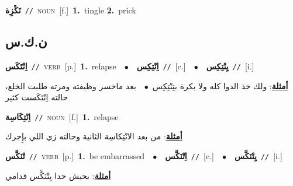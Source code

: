 \documentclass[10pt,a4paper,twoside]{article} %
\begin{document}
\begin{multicols}{2}
{\setlength\topsep{0pt}\textbf{\foreignlanguage{arabic}{نَكْزِة}}\ {\color{gray}\texttt{//}\color{black}}\ \textsc{noun}\ [f.]\ \textbf{1.}~tingle  \textbf{2.}~prick\ } \vspace{2mm}

\vspace{-3mm}
\subsection*{\color{blue}\foreignlanguage{arabic}{ن.ك.س}\color{blue}{}} 

{\setlength\topsep{0pt}\textbf{\foreignlanguage{arabic}{اِنْتَكَس}}\ {\color{gray}\texttt{//}\color{black}}\ \textsc{verb}\ [p.]\ \textbf{1.}~relapse\ \ $\bullet$\ \ \setlength\topsep{0pt}\textbf{\foreignlanguage{arabic}{اِنْتِكِس}}\ {\color{gray}\texttt{//}\color{black}}\ [c.]\ \ $\bullet$\ \ \setlength\topsep{0pt}\textbf{\foreignlanguage{arabic}{يِنْتِكِس}}\ {\color{gray}\texttt{//}\color{black}}\ [i.]\  \begin{flushright}\color{gray}\foreignlanguage{arabic}{\textbf{\underline{\foreignlanguage{arabic}{أمثلة}}}: ولك خذ الدوا كله ولا بكرة بتِنْتِكِس\ $\bullet$\ \  بعد ماخسر وظيفته ومرته طلبت الخلع، حالته اِنْتَكَست كثير}\end{flushright}\color{black}} \vspace{2mm}

{\setlength\topsep{0pt}\textbf{\foreignlanguage{arabic}{اِنْتِكَاسِة}}\ {\color{gray}\texttt{//}\color{black}}\ \textsc{noun}\ [f.]\ \textbf{1.}~relapse\  \begin{flushright}\color{gray}\foreignlanguage{arabic}{\textbf{\underline{\foreignlanguage{arabic}{أمثلة}}}: من بعد الانْتِكاسِة الثانية وحالته زي اللي بإِجرك}\end{flushright}\color{black}} \vspace{2mm}

{\setlength\topsep{0pt}\textbf{\foreignlanguage{arabic}{تْنَكَّس}}\ {\color{gray}\texttt{//}\color{black}}\ \textsc{verb}\ [p.]\ \textbf{1.}~be embarrassed\ \ $\bullet$\ \ \setlength\topsep{0pt}\textbf{\foreignlanguage{arabic}{اِتْنَكَّس}}\ {\color{gray}\texttt{//}\color{black}}\ [c.]\ \ $\bullet$\ \ \setlength\topsep{0pt}\textbf{\foreignlanguage{arabic}{يِتْنَكَّس}}\ {\color{gray}\texttt{//}\color{black}}\ [i.]\  \begin{flushright}\color{gray}\foreignlanguage{arabic}{\textbf{\underline{\foreignlanguage{arabic}{أمثلة}}}: بحبش حدا يِتْنَكَّس قدامي}\end{flushright}\color{black}} \vspace{2mm}


\end{multicols}
\end{document}
